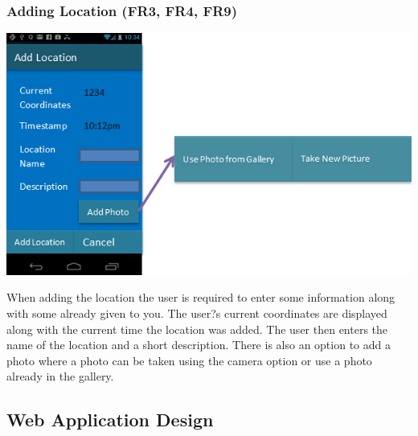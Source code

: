 \documentclass{project}
\begin{document}
\subsubsection{Adding Location (FR3, FR4, FR9)}
\bigskip
\includegraphics{PhoneUI4}
\bigskip

When adding the location the user is required to enter some information along with some already given to you.
The user?s current coordinates are displayed along with the current time the location was added.
The user then enters the name of the location and a short description.
There is also an option to add a photo where a photo can be taken using the camera option or use a photo already in the gallery.

\subsection{Web Application Design}
\end{document}
